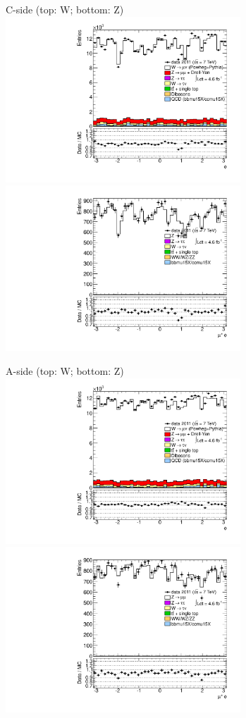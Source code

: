 {

\colb[T]

C-side (top: W; bottom: Z)
\centering
\includegraphics[width=0.66\textwidth]{dates/20130306/figures/etaphi/W_11_C_stack_l_phi_POS} \\
\includegraphics[width=0.66\textwidth]{dates/20130306/figures/etaphi/Z_11_C_stack_lP_phi_ALL.pdf}

A-side (top: W; bottom: Z)
\centering
\includegraphics[width=0.66\textwidth]{dates/20130306/figures/etaphi/W_11_A_stack_l_phi_POS} \\
\includegraphics[width=0.66\textwidth]{dates/20130306/figures/etaphi/Z_11_A_stack_lP_phi_ALL.pdf} 

\cole
}


